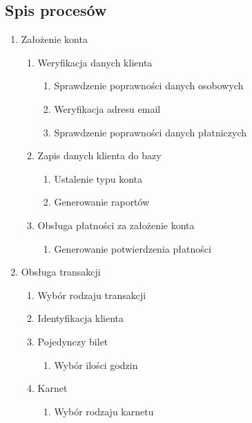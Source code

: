 \documentclass[a4paper,11pt]{article}
\begin{document}
\subsection{Spis procesów}
\begin{enumerate}
    \item Założenie konta
        \begin{enumerate}
            \item Weryfikacja danych klienta
                \begin{enumerate}
                    \item Sprawdzenie poprawności danych osobowych
                    \item Weryfikacja adresu email
                    \item Sprawdzenie poprawności danych płatniczych
                \end{enumerate}
            \item Zapis danych klienta do bazy
                \begin{enumerate}
                    \item Ustalenie typu konta
                    \item Generowanie raportów
                \end{enumerate}
            \item Obsługa płatności za założenie konta
                \begin{enumerate}
                    \item Generowanie potwierdzenia płatności
                \end{enumerate}
        \end{enumerate}
    \item Obsługa transakcji
        \begin{enumerate}
            \item Wybór rodzaju transakcji
            \item Identyfikacja klienta
            \item Pojedynczy bilet
                \begin{enumerate}
                    \item Wybór ilości godzin
                \end{enumerate}
            \item Karnet
                \begin{enumerate}
                    \item Wybór rodzaju karnetu
                \end{enumerate}

\end{enumerate}
\end{enumerate}
\end{document}
